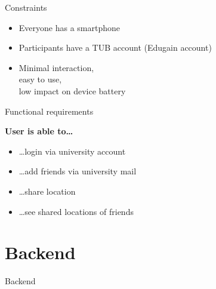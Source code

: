 \documentclass[11pt]{beamer}
\begin{document}
\begin{frame}{Constraints}

  \begin{itemize}

    \item Everyone has a smartphone
  	\item Participants have a TUB account (Edugain account)
  	\item Minimal interaction,\\easy to use,\\low impact on device battery

  \end{itemize}

\end{frame}


\begin{frame}{Functional requirements}

  \textbf{User is able to\ldots}

  \vspace{0.25cm}

  \begin{itemize}
    \item \ldots login via university account
    \item \ldots add friends via university mail
    \item \ldots share location
    \item \ldots see shared locations of friends
  \end{itemize}

\end{frame}


\section{Backend}

\begin{frame}{}

  \begin{center}

    {\Huge Backend}

  \end{center}

\end{frame}
\end{document}
